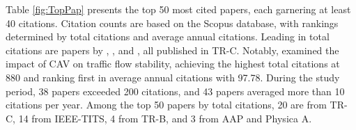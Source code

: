 \documentclass[a4paper,fleqn]{cas-sc}
\begin{document}
Table \ref{fig:TopPap} presents the top 50 most cited papers, each garnering at least 40 citations. Citation counts are based on the Scopus database, with rankings determined by total citations and average annual citations. Leading in total citations are papers by \cite{talebpourInfluenceConnectedAutonomousVehicles2016a}, \cite{milanesModelingCooperativeAutonomousAdaptive2014b}, and \cite{kestingAdaptiveCruiseControlDesign2008}, all published in TR-C. Notably, \cite{talebpourInfluenceConnectedAutonomousVehicles2016a} examined the impact of CAV on traffic flow stability, achieving the highest total citations at 880 and ranking first in average annual citations with 97.78. During the study period, 38 papers exceeded 200 citations, and 43 papers averaged more than 10 citations per year. Among the top 50 papers by total citations, 20 are from TR-C, 14 from IEEE-TITS, 4 from TR-B, and 3 from AAP and Physica A.
\end{document}
